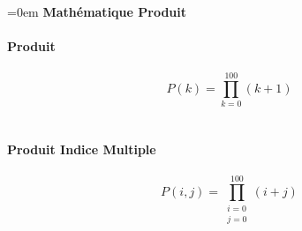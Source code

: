 \documentclass{article}
\begin{document}
\parindent=0em
\textbf{Mathématique Produit} \\ \\
\textbf{Produit} \\ \\
$$P(k)=\prod_{k=0}^{100} (k+1)$$ \\ \\
\textbf{Produit Indice Multiple} \\ \\
$$P(i,j)=\prod_{\substack{i=0 \\ j=0}}^{100} (i+j)$$ \\ \\
\end{document}
